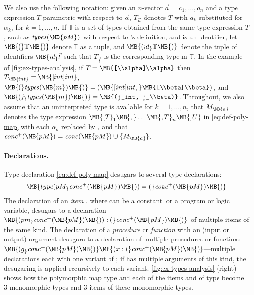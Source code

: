 \documentclass[a4paper,final]{llncs}
\makeatletter
\newcommand{\tightParagraph}[1]{\paragraph{#1}}
\newcommand\tightParagraph{\@startsection{paragraph}{4}{\z@}{-5\p@ \@plus -4\p@ \@minus -4\p@}{-0.5em \@plus -0.22em \@minus -0.1em}{\normalfont\normalsize\itshape}}
\newcommand{\typesOf}[1]{\mathit{types}(\MB{#1})}
\newcommand{\ctypesOf}[1]{\mathit{conc}(\MB{#1})}
\newcommand{\concPlus}[1]{\mathit{conc}^+(\MB{#1})}
\newcommand{\BBT}{\mathbb{T}}
\makeatother
\begin{document}
We also use the following notation: given an $n$-vector $\vec{a} = a_1, \ldots, a_n$ and a type expression $T$ parametric with respect to $\vec{\alpha}$, $T_{\vec{a}}$ denotes $T$ with $a_k$ substituted for $\alpha_k$, for $k = 1, \ldots, n$.
If $\BBT$ is a set of types obtained from the same type expression $T$, such as $\typesOf{pM}$ with respect to 's definition, and  is an identifier, let $\MB{(}\BBT\MB{)}$ denote $\BBT$ as a tuple, and $\MB{(id_}\BBT\MB{)}$ denote the tuple of identifiers $\MB{id_}\vec{t}$ such that $T_{\vec{t}}$ is the corresponding type in $\BBT$.
In the example of \autoref{fig:ex-types-analysis}, if $T = \MB{[\\alpha]\\alpha}$ then $T_{\MB{int}} = \MB{[int]int}$, $\MB{(}\typesOf{m}\MB{)} = (\MB{[int]int,} \MB{[\\beta]\\beta})$, and $\MB{(j_}\typesOf{m}\MB{)} = \MB{(j_int, j_\\beta)}$.
Throughout, we also assume that an uninterpreted type  is available for $k = 1, \ldots, n$, that $M_{\MB{a}}$ denotes the type expression $\MB{[T}_1\MB{,} \ldots \MB{,T}_n\MB{] U}$ in \eqref{eq:def-poly-map} with each $\alpha_k$ replaced by , and that $\concPlus{pM} = \ctypesOf{pM} \cup \{M_{\MB{a}}\}$.

\tightParagraph{Declarations.}
Type declaration \eqref{eq:def-poly-map} desugars to several type declarations:
\begin{equation}
\MB{type (pM_}\concPlus{pM}\MB{)) = (}\concPlus{pM}\MB{)}
\label{eq:poly-map-desugared}
\end{equation}
The declaration of an \emph{item} , where  can be a constant, or a program or logic variable,  desugars to a declaration  
$\MB{(pm_}\concPlus{pM}\MB{)): (}\concPlus{pM}\MB{)}$ of multiple items of the same kind.
The declaration of a \emph{procedure} or \emph{function}  with an (input or output) argument  desugars to a declaration of multiple procedures or functions 
$\MB{(g_}\concPlus{pM}\MB{)}\MB{(x: (}\concPlus{pM}\MB{)}$---multiple declarations each with one variant of ; if  has multiple arguments of this kind, the desugaring is applied recursively to each variant.
\autoref{fig:ex-types-analysis} (right) shows how the polymorphic map type  and each of the items  and  of type  become 3 monomorphic types and 3 items of these monomorphic types.
\end{document}
